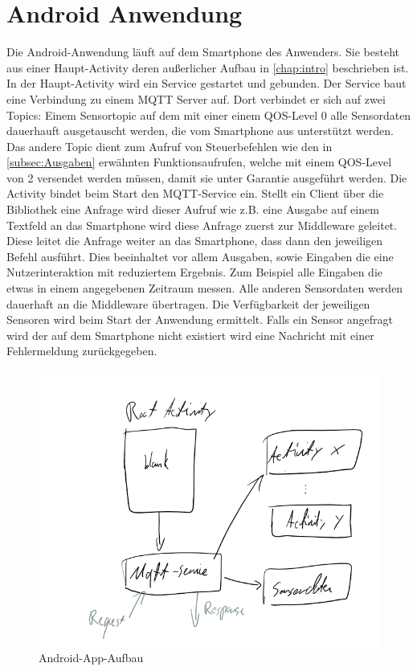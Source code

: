 \documentclass[11pt,a4paper]{report}
\begin{document}
\section*{Android Anwendung}
Die Android-Anwendung läuft auf dem Smartphone des Anwenders.
Sie besteht aus einer Haupt-Activity deren außerlicher Aufbau in \ref{chap:intro} beschrieben ist. 
\\
In der Haupt-Activity wird ein Service gestartet und gebunden.
Der Service baut eine Verbindung zu einem MQTT Server auf.
Dort verbindet er sich auf zwei Topics: Einem Sensortopic auf dem mit einer einem QOS-Level 0 alle Sensordaten dauerhauft ausgetauscht werden, die vom Smartphone aus unterstützt werden.
Das andere Topic dient zum Aufruf von Steuerbefehlen wie den in \ref{subsec:Ausgaben} erwähnten Funktionsaufrufen, welche mit einem QOS-Level von 2 versendet werden müssen, damit sie unter Garantie ausgeführt werden.
Die Activity bindet beim Start den MQTT-Service ein.
Stellt ein Client über die Bibliothek eine Anfrage wird dieser Aufruf wie z.B. eine Ausgabe auf einem Textfeld an das Smartphone wird diese Anfrage zuerst zur Middleware geleitet.
Diese leitet die Anfrage weiter an das Smartphone, dass dann den jeweiligen Befehl ausführt.
Dies beeinhaltet vor allem Ausgaben, sowie Eingaben die eine Nutzerinteraktion mit reduziertem Ergebnis.
Zum Beispiel alle Eingaben die etwas in einem angegebenen Zeitraum messen.
Alle anderen Sensordaten werden dauerhaft an die Middleware übertragen.
Die Verfügbarkeit der jeweiligen Sensoren wird beim Start der Anwendung ermittelt.
Falls ein Sensor angefragt wird der auf dem Smartphone nicht existiert wird eine Nachricht mit einer Fehlermeldung zurückgegeben.
\begin{figure}[htbp]
  \centering
  \includegraphics[width=.9\textwidth]{images/android_app.png}
  \caption{Android-App-Aufbau}
  \label{fig:android_app}
\end{figure}
\end{document}
